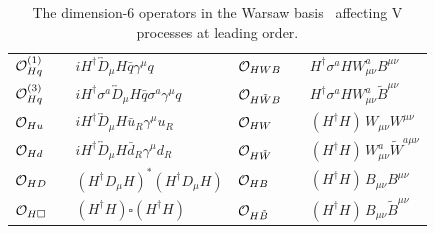 \documentclass[a4paper,11pt]{article}
\renewcommand{\PV}{{{{V}}}\xspace}
\newcommand{\VH}{{{\PV}{\PH}}\xspace}
\begin{document}
\begin{table}[tph]
\caption{
The dimension-6 operators in the Warsaw basis~\cite{Grzadkowski:2010es} affecting \VH  processes at leading order.
}
\begin{center}
{\renewcommand{\arraystretch}{1.3}
\begin{tabular}{lcl|lcl}
${\cal O}^{(1)}_{Hq}$&&$i H^\dagger \overleftrightarrow{D}_\mu H \bar{q}   \gamma^\mu q$&${\cal O}_{HWB}$&&$ H^\dagger \sigma^a H W^a_{\mu\nu}B^{\mu\nu}$ \\
\rule{0pt}{4ex} ${\cal O}^{(3)}_{Hq}$&&$i H^\dagger \sigma^a \overleftrightarrow{D}_\mu H \bar{q}  \sigma^a \gamma^\mu q$ &${\cal O}_{H\tilde{W}B}$&&$ H^\dagger \sigma^a H W^a_{\mu\nu}\tilde{B}^{\mu\nu}$\\
\rule{0pt}{4ex} ${\cal O}_{Hu}$&&$i H^\dagger \overleftrightarrow{D}_\mu H \bar{u}_R  \gamma^\mu u_R$&${\cal O}_{H{W}}$&&$(H^\dagger H)\,W_{\mu\nu}{W}^{\mu\nu}$\\
\rule{0pt}{4ex} ${\cal O}_{Hd}$&&$i H^\dagger \overleftrightarrow{D}_\mu H \bar{d}_R  \gamma^\mu d_R$&${\cal O}_{H\tilde{W}}$&&$ (H^\dagger H)\, W^a_{\mu\nu}\tilde{W}^{a \mu\nu}$\\
\rule{0pt}{4ex} ${\cal O}_{HD}$&&$(H^\dagger  {D}_\mu H)^*(H^\dagger  {D}_\mu H)$& ${\cal O}_{HB}$&&$(H^\dagger H)\,B_{\mu\nu}B^{\mu\nu}$\\
\rule{0pt}{4ex} ${\cal O}_{H\square}$&&$(H^\dagger H) \square (H^\dagger H)$& ${\cal O}_{H\tilde{B}}$&&$(H^\dagger H)\,B_{\mu\nu}\tilde{B}^{\mu\nu}$
\end{tabular}}
\label{Tab:Operators}
\end{center}
\end{table}
\end{document}
